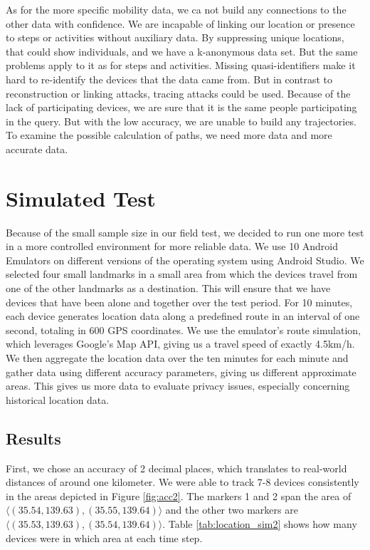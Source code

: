 As for the more specific mobility data, we ca not build any connections to the other data with confidence. We are incapable of linking our location or presence to steps or activities without auxiliary data. By suppressing unique locations, that could show individuals, and we have a k-anonymous data set. But the same problems apply to it as for steps and activities. Missing quasi-identifiers make it hard to re-identify the devices that the data came from. 
But in contrast to reconstruction or linking attacks, tracing attacks could be used. Because of the lack of participating devices, we are sure that it is the same people participating in the query. But with the low accuracy, we are unable to build any trajectories. To examine the possible calculation of paths, we need more data and more accurate data.

\section{Simulated Test}
Because of the small sample size in our field test, we decided to run one more test in a more controlled environment for more reliable data. We use 10 Android Emulators on different versions of the operating system using Android Studio. We selected four small landmarks in a small area from which the devices travel from one of the other landmarks as a destination. This will ensure that we have devices that have been alone and together over the test period. For 10 minutes, each device generates location data along a predefined route in an interval of one second, totaling in 600 GPS coordinates. We use the emulator's route simulation, which leverages Google's Map API, giving us a travel speed of exactly 4.5km/h. We then aggregate the location data over the ten minutes for each minute and gather data using different accuracy parameters, giving us different approximate areas. This gives us more data to evaluate privacy issues, especially concerning historical location data.

\subsection{Results}
First, we chose an accuracy of 2 decimal places, which translates to real-world distances of around one kilometer. We were able to track 7-8 devices consistently in the areas depicted in Figure \ref{fig:acc2}. The markers 1 and 2 span the area of \(\langle(35.54, 139.63),(35.55, 139.64)\rangle\) and the other two markers are \(\langle(35.53, 139.63),(35.54, 139.64)\rangle\). Table \ref{tab:location_sim2} shows how many devices were in which area at each time step. 

